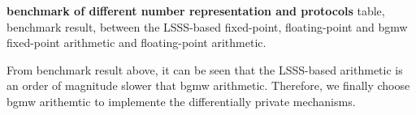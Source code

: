 \textbf{benchmark of different number representation and protocols}
table, benchmark result, between the LSSS-based fixed-point, floating-point and bgmw fixed-point arithmetic and floating-point arithmetic. 

From benchmark result above, it can be seen that the LSSS-based arithmetic is an order of magnitude slower that bgmw arithmetic. Therefore, we finally choose bgmw arithemtic to implemente the differentially private mechanisms. 










